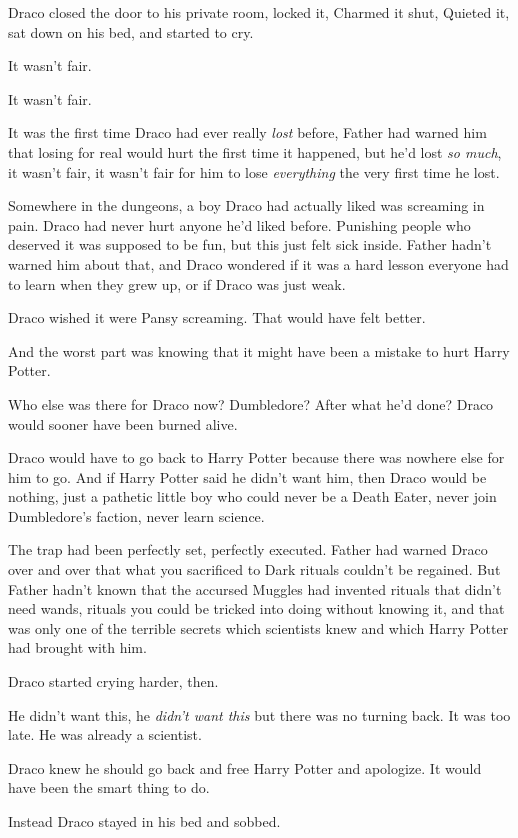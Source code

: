 Draco closed the door to his private room, locked it, Charmed it shut, Quieted 
it, sat down on his bed, and started to cry.

It wasn't fair.

It wasn't fair.

It was the first time Draco had ever really \emph{lost} before, Father had 
warned him that losing for real would hurt the first time it happened, but he'd 
lost \emph{so much}, it wasn't fair, it wasn't fair for him to lose 
\emph{everything} the very first time he lost.

Somewhere in the dungeons, a boy Draco had actually liked was screaming in 
pain. Draco had never hurt anyone he'd liked before. Punishing people who 
deserved it was supposed to be fun, but this just felt sick inside. Father 
hadn't warned him about that, and Draco wondered if it was a hard lesson 
everyone had to learn when they grew up, or if Draco was just weak.

Draco wished it were Pansy screaming. That would have felt better.

And the worst part was knowing that it might have been a mistake to hurt Harry 
Potter.

Who else was there for Draco now? Dumbledore? After what he'd done? Draco would 
sooner have been burned alive.

Draco would have to go back to Harry Potter because there was nowhere else for 
him to go. And if Harry Potter said he didn't want him, then Draco would be 
nothing, just a pathetic little boy who could never be a Death Eater, never 
join Dumbledore's faction, never learn science.

The trap had been perfectly set, perfectly executed. Father had warned Draco 
over and over that what you sacrificed to Dark rituals couldn't be regained. 
But Father hadn't known that the accursed Muggles had invented rituals that 
didn't need wands, rituals you could be tricked into doing without knowing it, 
and that was only one of the terrible secrets which scientists knew and which 
Harry Potter had brought with him.

Draco started crying harder, then.

He didn't want this, he \emph{didn't want this} but there was no turning back. 
It was too late. He was already a scientist.

Draco knew he should go back and free Harry Potter and apologize. It would have 
been the smart thing to do.

Instead Draco stayed in his bed and sobbed.

